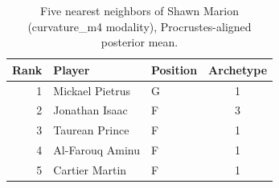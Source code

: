 \begin{table}[htbp]
  \centering\small
  \begin{tabular}{rllc}
    \toprule
    Rank & Player & Position & Archetype \\
    \midrule
    1 & Mickael Pietrus & G & 1 \\
    2 & Jonathan Isaac & F & 3 \\
    3 & Taurean Prince & F & 1 \\
    4 & Al-Farouq Aminu & F & 1 \\
    5 & Cartier Martin & F & 1 \\
    \bottomrule
  \end{tabular}
  \caption{Five nearest neighbors of Shawn Marion (curvature_m4 modality), Procrustes-aligned posterior mean.}
  \label{tab:Shawn_Marion_neighbors_curvature_m4}
\end{table}

